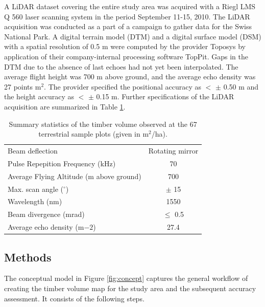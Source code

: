 A LiDAR dataset covering the entire study area was acquired with a Riegl LMS Q 560 laser scanning system in the period September 11-15, 2010. The LiDAR acquisition was conducted as a part of a campaign to gather data for the Swiss National Park. A digital terrain model (DTM) and a digital surface model (DSM) with a spatial resolution of 0.5 m were computed by the provider Toposys by application of their company-internal processing software TopPit. Gaps in the DTM due to the absence of last echoes had not yet been interpolated. The average flight height was 700 m above ground, and the average echo density was 27 points m$^2$. The provider specified the positional accuracy as $<$ $\pm$ 0.50 m and the height accuracy as $<$ $\pm$ 0.15 m. Further specifications of the LiDAR acquisition are summarized in Table \ref{tab:lidarspecs}.

\begin{table}[H]
	\begin{center}
		\caption{Summary  statistics  of  the  timber  volume  observed  at  the  67  terrestrial sample plots (given in m$^2$/ha).}
		\vspace{0.2cm}
		\label{tab:lidarspecs}
		\begin{tabular}{|l|c|}
			\hline \hline
			Beam deflection & Rotating mirror \\
			Pulse Repepition Frequency (kHz) & 70 \\
			Average Flying Altitude (m above ground) & 700 \\
			Max. scan angle ($^\circ$) & $\pm$ 15  \\
			Wavelength (nm) & 1550 \\
			Beam divergence (mrad) & $\leq$ 0.5 \\
			Average echo density (m$-2$) & 27.4 \\
			\hline \hline
		\end{tabular} 
	\end{center}
\end{table}


\subsection{Methods}
\label{sec:met}

The conceptual model in Figure \ref{fig:concept} captures the general workflow of creating the timber volume map for the study area and the subsequent accuracy assessment. It consists of the following steps.

